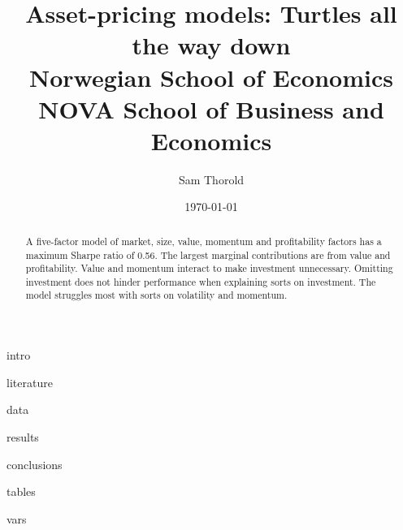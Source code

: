 \documentclass[a4paper, 12pt]{article}
\title{
  {Asset-pricing models: Turtles all the way down}\\
  {\large Norwegian School of Economics}\\
  {\large NOVA School of Business and Economics}
}
\author{Sam Thorold}
\date{\today}
\begin{document}
\maketitle

\begin{abstract}
  A five-factor model of
  market, size, value, momentum and profitability factors
  has a maximum Sharpe ratio of 0.56.
  The largest marginal contributions are from value and profitability.
  Value and momentum interact to make investment unnecessary.
  Omitting investment does not hinder performance when explaining sorts on investment.
  The model struggles most with sorts on volatility and momentum.
\end{abstract}

{intro}

{literature}

{data}


{results}

{conclusions}

\printbibliography

\appendix

{tables}


{vars}

\end{document}
